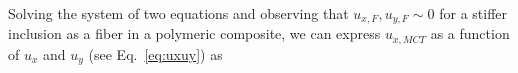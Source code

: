 \documentclass[review]{elsarticle}
\begin{document}
%

Solving the system of two equations and observing that $u_{x,F},u_{y,F}\sim0$ for a stiffer inclusion as a fiber in a polymeric composite, we can express $u_{x,MCT}$ as a function of $u_{x}$ and $u_{y}$ (see Eq.~\ref{eq:uxuy}) as
\end{document}

